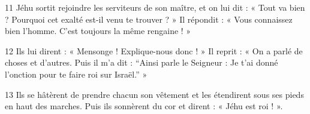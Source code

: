 
11 Jéhu sortit rejoindre les serviteurs de son maître, et on lui dit : « Tout va bien ? Pourquoi cet exalté est-il venu te trouver ? » Il répondit : « Vous connaissez bien l’homme. C’est toujours la même rengaine ! »

12 Ils lui dirent : « Mensonge ! Explique-nous donc ! » Il reprit : « On a parlé de choses et d’autres. Puis il m’a dit : “Ainsi parle le Seigneur : Je t’ai donné l’onction pour te faire roi sur Israël.” »

13 Ils se hâtèrent de prendre chacun son vêtement et les étendirent sous ses pieds en haut des marches. Puis ils sonnèrent du cor et dirent : « Jéhu est roi ! ».